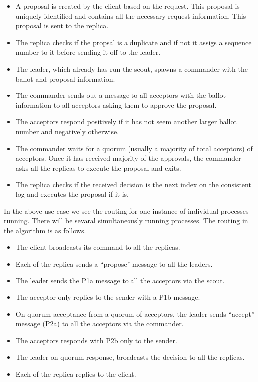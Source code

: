 \begin{itemize}
    \item A proposal is created by the client based on the request. This 
      proposal is uniquely identified and contains all the necessary request 
      information. This proposal is sent to the replica.
    \item The replica checks if the propsal is a duplicate and if not it
      assigs a sequence number%
      to it before sending it off to the leader.
    \item The leader, which already has run the scout, spawns a commander with
      the ballot and proposal information.
    \item The commander sends out a message to all acceptors with the ballot
      information to all acceptors asking them to approve the proposal.
    \item The acceptors respond positively if it has not seem another larger
      ballot number and negatively otherwise.
    \item The commander waits for a quorum (usually a majority of total 
      acceptors) of acceptors. Once it has received majority of the approvals,
      the commander asks all the replicas to execute the proposal and exits.
    \item The replica checks if the received decision is the next index on
      the consistent log and executes the proposal if it is.
\end{itemize}

In the above use case we see the routing for one instance of individual 
processes running. There will be sevaral simultaneously running processes. The
routing in the algorithm is as follows.

\begin{itemize}
  \item The client broadcasts its command to all the replicas.
  \item Each of the replica sends a ``propose'' message to all the leaders.
  \item The leader sends the P1a message to all the acceptors via the scout.
  \item The acceptor only replies to the sender with a P1b message.
  \item On quorum acceptance from a quorum of acceptors, the leader sends
    ``accept'' message (P2a) to all the acceptors via the commander.
  \item The acceptors responds with P2b only to the sender.
  \item The leader on quorum response, broadcasts the decision to all the
    replicas.
  \item Each of the replica replies to the client.
\end{itemize}

